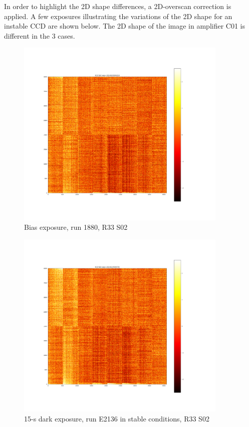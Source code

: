 In order to highlight the 2D shape differences, a 2D-overscan correction
is applied. A few exposures illustrating the variations of the 2D shape
for an instable CCD are shown below. The 2D shape of the image in
amplifier C01 is different in the 3 cases.

\begin{figure}
\begin{centering}
\includegraphics[width=0.9\textwidth]{sections/figures/E1880_bias_R33_S02.png}
\end{centering}
\caption{Bias exposure, run 1880, R33 S02}
\end{figure}

\begin{figure}
\begin{centering}
\includegraphics[width=0.9\textwidth]{sections/figures/E2136_dark15_R33_S02.png}
\end{centering}
\caption{15-s dark exposure, run E2136 in
\textquotesingle stable\textquotesingle{} conditions, R33 S02}
\end{figure}


